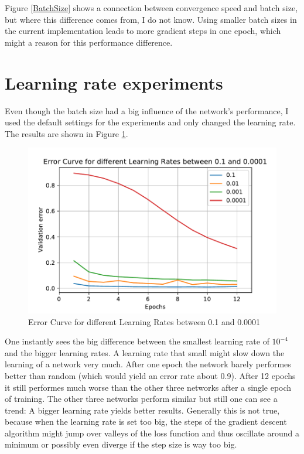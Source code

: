 \documentclass[
        a4paper,
        10pt,
        parskip = full,    %
    ]{scrartcl}
\begin{document}
Figure \ref{BatchSize} shows a connection between convergence speed and batch
size, but where this difference comes from, I do not know. Using smaller batch
sizes in the current implementation leads to more gradient steps in one epoch,
which might a reason for this performance difference.

\section{Learning rate experiments}
Even though the batch size had a big influence of the network's performance, I
used the default settings for the experiments and only changed the learning rate.
The results are shown in Figure \ref{LearningRate}.

\begin{figure}[H]
	\includegraphics{../images/Error_curve_for_Learning_Rates.pdf}
	\caption{Error Curve for different Learning Rates between 0.1 and 0.0001}
  \label{LearningRate}
\end{figure}

One instantly sees the big difference between the smallest learning rate of
$10^{-4}$ and the bigger learning rates. A learning rate that small might slow
down the learning of a network very much. After one epoch the network barely
performes better than random (which would yield an error rate about 0.9). After
12 epochs it still performes much worse than the other three networks after a
single epoch of training. The other three networks perform similar but still one
can see a trend: A bigger learning rate yields better results. Generally this is
not true, because when the learning rate is set too big, the steps of the
gradient descent algorithm might jump over valleys of the loss function and thus
oscillate around a minimum or possibly even diverge if the step size is way too
big.
\end{document}
